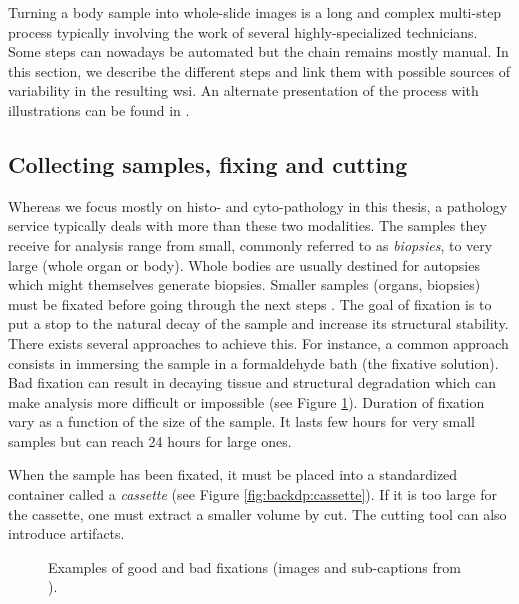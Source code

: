 Turning a body sample into whole-slide images is a long and complex multi-step process typically involving the work of several highly-specialized technicians. Some steps can nowadays be automated but the chain remains mostly manual. In this section, we describe the different steps and link them with possible sources of variability in the resulting \acrshort{wsi}. An alternate presentation of the process with illustrations can be found in \parencite{mccann2014automated}. 

\subsection{Collecting samples, fixing and cutting}

Whereas we focus mostly on histo- and cyto-pathology in this thesis, a pathology service typically deals with more than these two modalities. The samples they receive for analysis range from small, commonly referred to as \textit{biopsies}, to very large (whole organ or body). Whole bodies are usually destined for autopsies which might themselves generate biopsies. Smaller samples (organs, biopsies) must be fixated before going through the next steps \parencite{rolls2012process}. The goal of fixation is to put a stop to the natural decay of the sample and increase its structural stability. There exists several approaches to achieve this. For instance, a common approach consists in immersing the sample in a formaldehyde bath (\ie the fixative solution). Bad fixation can result in decaying tissue and structural degradation which can make analysis more difficult or impossible (see Figure \ref{fig:backdp:fixation}). Duration of fixation vary as a function of the size of the sample. It lasts few hours for very small samples but can reach 24 hours for large ones. 

When the sample has been fixated, it must be placed into a standardized container called a \textit{cassette} (see Figure \ref{fig:backdp:cassette}). If it is too large for the cassette, one must extract a smaller volume by cut. The cutting tool can also introduce artifacts.  

\begin{figure}
  \centering
  \quad
  
    
  \caption{Examples of good and bad fixations (images and sub-captions from \parencite{rolls2012process}).}
  \label{fig:backdp:fixation}
\end{figure}

